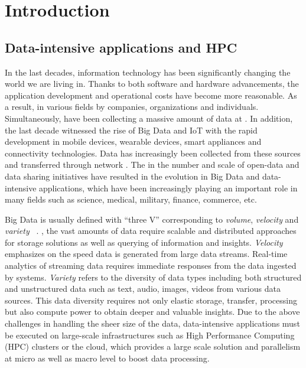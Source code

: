 \chapter{Introduction}
\label{introduction}

\section{Data-intensive applications and HPC}

In the last decades, information technology has been significantly changing the 
world we are living in. 
Thanks to both software and hardware advancements, the application development 
and operational costs have become more reasonable. 
As a result,  in various fields by companies, 
organizations and individuals. Simultaneously,  have been collecting a massive 
amount of data at .
In addition, the last decade witnessed the rise of Big Data and IoT with the rapid 
development in mobile devices, wearable devices, smart appliances and connectivity  
technologies. Data has increasingly been collected from these sources and transferred 
through network . 
The  in the number and scale of open-data and data sharing initiatives 
have resulted in the evolution in Big Data and data-intensive applications, 
which have been increasingly playing an important role in many fields such as 
science, medical, military, finance, commerce, etc.

Big Data is usually defined with ``three V'' corresponding to \textit{volume}, 
\textit{velocity} and \textit{variety} ~\cite{de2016formal}.  
, the vast amounts of data require scalable and distributed 
approaches for storage solutions as well as querying of information and insights.  
\textit{Velocity} emphasizes on the speed  data is generated from large data 
streams. Real-time analytics of streaming data requires immediate responses 
from the data ingested by systems.
\textit{Variety} refers to the diversity of data types including both structured and 
unstructured data such as text, audio, images, videos from various data sources.
This data diversity requires not only elastic storage, transfer, processing but also 
compute power to obtain deeper and valuable insights.  
Due to the above challenges in handling the sheer size of the data, data-intensive 
applications must be executed on large-scale infrastructures such as High Performance 
Computing (HPC) clusters or the cloud, which provides a large scale solution 
and parallelism at micro as well as macro level to boost data processing.


